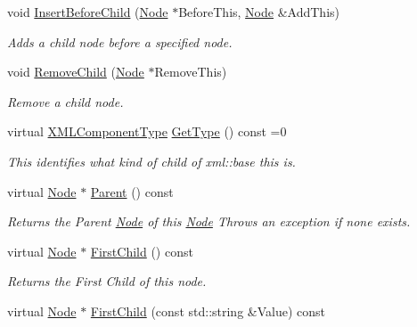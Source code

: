 \begin{DoxyCompactItemize}
void \hyperlink{classphys_1_1xml_1_1Node_a1a88abeab2861b2d194e235c6078fdfc}{InsertBeforeChild} (\hyperlink{classphys_1_1xml_1_1Node}{Node} $\ast$BeforeThis, \hyperlink{classphys_1_1xml_1_1Node}{Node} \&AddThis)
\begin{DoxyCompactList}\small\item\em Adds a child node before a specified node. \item\end{DoxyCompactList}\item 
void \hyperlink{classphys_1_1xml_1_1Node_a25872a8bd3375a26898c86dfa0929de0}{RemoveChild} (\hyperlink{classphys_1_1xml_1_1Node}{Node} $\ast$RemoveThis)
\begin{DoxyCompactList}\small\item\em Remove a child node. \item\end{DoxyCompactList}\item 
virtual \hyperlink{classphys_1_1xml_1_1Base_a62ba0484b5ecb502f9ae9d82d3720320}{XMLComponentType} \hyperlink{classphys_1_1xml_1_1Node_a32273db5897cc54fa8c0e30d686a866b}{GetType} () const =0
\begin{DoxyCompactList}\small\item\em This identifies what kind of child of xml::base this is. \item\end{DoxyCompactList}\item 
virtual \hyperlink{classphys_1_1xml_1_1Node}{Node} $\ast$ \hyperlink{classphys_1_1xml_1_1Node_ae4e5d2c6e1ae6db5e772a60506b54bf2}{Parent} () const 
\begin{DoxyCompactList}\small\item\em Returns the Parent \hyperlink{classphys_1_1xml_1_1Node}{Node} of this \hyperlink{classphys_1_1xml_1_1Node}{Node} Throws an exception if none exists. \item\end{DoxyCompactList}\item 
virtual \hyperlink{classphys_1_1xml_1_1Node}{Node} $\ast$ \hyperlink{classphys_1_1xml_1_1Node_aad5d09b26f34d798ee5b79bdee3d6a87}{FirstChild} () const 
\begin{DoxyCompactList}\small\item\em Returns the First Child of this node. \item\end{DoxyCompactList}\item 
virtual \hyperlink{classphys_1_1xml_1_1Node}{Node} $\ast$ \hyperlink{classphys_1_1xml_1_1Node_ade18fbdda2048775938b9bcea35f6bd7}{FirstChild} (const std::string \&Value) const 

\end{DoxyCompactItemize}
